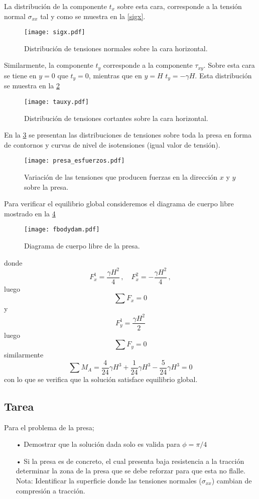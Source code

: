 \documentclass[../notas medios.tex]{subfiles}
\begin{document}
La distribución de la componente $t_x$ sobre esta cara, corresponde a la tensión normal $\sigma_{xx}$ tal y como se muestra en la \cref{sigx}.
\begin{figure}[H]
\centering
	\texttt{[image: sigx.pdf]}
	\caption{Distribución de tensiones normales sobre la cara horizontal.}
	\label{sigy}
\end{figure}

Similarmente, la componente $t_y$ corresponde a la componente $\tau_{xy}$. Sobre esta cara se tiene en $y=0$  que $t_y = 0$, mientras que en $y=H$ $t_y = - \gamma H$. Esta distribución se muestra en la \cref{taoxy}
\begin{figure}[H]
\centering
	\texttt{[image: tauxy.pdf]}
	\caption{Distribución de tensiones cortantes sobre la cara horizontal.}
	\label{taoxy}
\end{figure}


En la \cref{fig:contornos_presa} se presentan las distribuciones de tensiones sobre toda la presa en forma de contornos y curvas de nivel de isotensiones (igual valor de tensión).
\begin{figure}[H]
     \centering
     \texttt{[image: presa\_esfuerzos.pdf]}
     \caption{Variación de las tensiones que producen fuerzas en la dirección $x$ y $y$ sobre la presa.}
     \label{fig:contornos_presa}
\end{figure}


Para verificar el equilibrio global consideremos el diagrama de cuerpo libre mostrado en la \cref{dcl}
\begin{figure}[H]
\centering
	\texttt{[image: fbodydam.pdf]}
	\caption{Diagrama de cuerpo libre de la presa.}
	\label{dcl}
\end{figure}
donde
\[F_x^1 = \frac{\gamma H^2}{4}\, ,\quad
F_x^2 =  - \frac{\gamma H^2}{4}\, ,\]
luego
\[\sum {{F_x} = 0} \]
y
\[F_y^1 = \frac{{\gamma {H^2}}}{2}\]
luego
\[\sum {{F_y} = 0} \]
similarmente
\[\sum {{M_A} = } \frac{4}{{24}}\gamma {H^3} + \frac{1}{{24}}\gamma {H^3} - \frac{5}{{24}}\gamma {H^3} = 0\]
con lo que se verifica que la solución satisface equilibrio global.

\subsection*{Tarea}
Para el problema de la presa;

\begin{itemize}
\item[•] Demostrar que la solución dada solo es valida para $\phi = \pi/4$
\item[•] Si la presa es de concreto, el cual presenta baja resistencia a la tracción determinar la zona de la presa que se debe reforzar para que esta no flalle. Nota: Identificar la superficie donde las tensiones normales ($\sigma_{xx}$) cambian de compresión a tracción.
\end{itemize}
\end{document}
